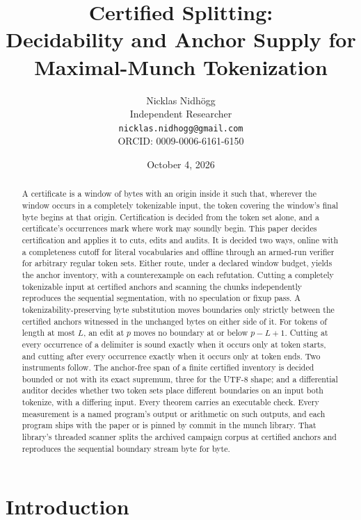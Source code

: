 \documentclass[11pt,a4paper]{article}
\title{Certified Splitting:\\Decidability and Anchor Supply for\\Maximal-Munch Tokenization}
\author{Nicklas Nidh\"ogg\\[0.4em] \normalsize Independent Researcher\\ \normalsize
\texttt{nicklas.nidhogg@gmail.com}\\ \normalsize ORCID: 0009-0006-6161-6150}
\date{October 4, 2026}
\theoremstyle{definition}
\theoremstyle{plain}
\begin{document}
\maketitle

\begin{abstract}
A certificate is a window of bytes with an origin inside it such that, wherever the window occurs in a completely
tokenizable input, the token covering the window's final byte begins at that origin. Certification is decided from the
token set alone, and a certificate's occurrences mark where work may soundly begin. This paper decides certification and
applies it to cuts, edits and audits. It is decided two ways, online with a completeness cutoff for literal vocabularies
and offline through an armed-run verifier for arbitrary regular token sets. Either route, under a declared window
budget, yields the anchor inventory, with a counterexample on each refutation. Cutting a completely tokenizable input at
certified anchors and scanning the chunks independently reproduces the sequential segmentation, with no speculation or
fixup pass. A tokenizability-preserving byte substitution moves boundaries only strictly between the certified anchors
witnessed in the unchanged bytes on either side of it. For tokens of length at most $L$, an edit at $p$ moves no
boundary at or below $p - L + 1$. Cutting at every occurrence of a delimiter is sound exactly when it occurs only at
token starts, and cutting after every occurrence exactly when it occurs only at token ends. Two instruments follow. The
anchor-free span of a finite certified inventory is decided bounded or not with its exact supremum, three for the UTF-8
shape; and a differential auditor decides whether two token sets place different boundaries on an input both tokenize,
with a differing input. Every theorem carries an executable check. Every measurement is a named program's output or
arithmetic on such outputs, and each program ships with the paper or is pinned by commit in the munch library. That
library's threaded scanner splits the archived campaign corpus at certified anchors and reproduces the sequential
boundary stream byte for byte.
\end{abstract}

\section{Introduction}\label{sec:intro}
\end{document}
